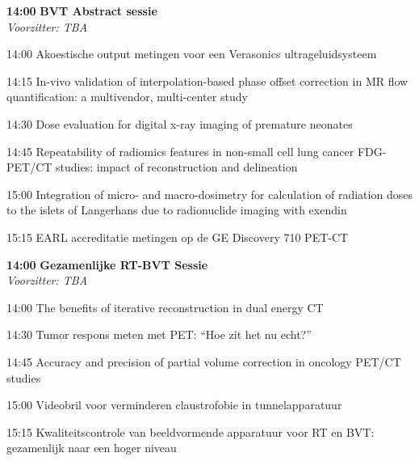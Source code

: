 \documentclass[a4paper,10pt]{report}
\begin{document}
\begin{multicols*}{3}

\begin{packed_enum}
\item[\textbf{14:00}]\textbf{BVT Abstract sessie}\\\textit{Voorzitter: TBA}
\item[14:00] Akoestische output metingen voor een Verasonics ultrageluidsysteem
\item[14:15] In-vivo validation of interpolation-based phase offset correction in MR flow quantification: a multivendor, multi-center study
\item[14:30] Dose evaluation for digital x-ray imaging of premature neonates
\item[14:45] Repeatability of radiomics features in non-small cell lung cancer FDG-PET/CT studies: impact of reconstruction and delineation
\item[15:00] Integration of micro- and macro-dosimetry for calculation of radiation doses to the islets of Langerhans due to radionuclide imaging with exendin
\item[15:15] EARL accreditatie metingen op de GE Discovery 710 PET-CT
\end{packed_enum} %
 


\begin{packed_enum}
\item[\textbf{14:00}] \textbf{Gezamenlijke RT-BVT Sessie}\\\textit{Voorzitter: TBA}
\item[14:00] The benefits of iterative reconstruction in dual energy CT
\item[14:30] Tumor respons meten met PET: “Hoe zit het nu echt?”
\item[14:45] Accuracy and precision of partial volume correction in oncology PET/CT studies
\item[15:00] Videobril voor verminderen claustrofobie in tunnelapparatuur
\item[15:15] Kwaliteitscontrole van beeldvormende apparatuur voor RT en BVT: gezamenlijk naar een hoger niveau
\end{packed_enum} %


\end{multicols*}
\end{document}

